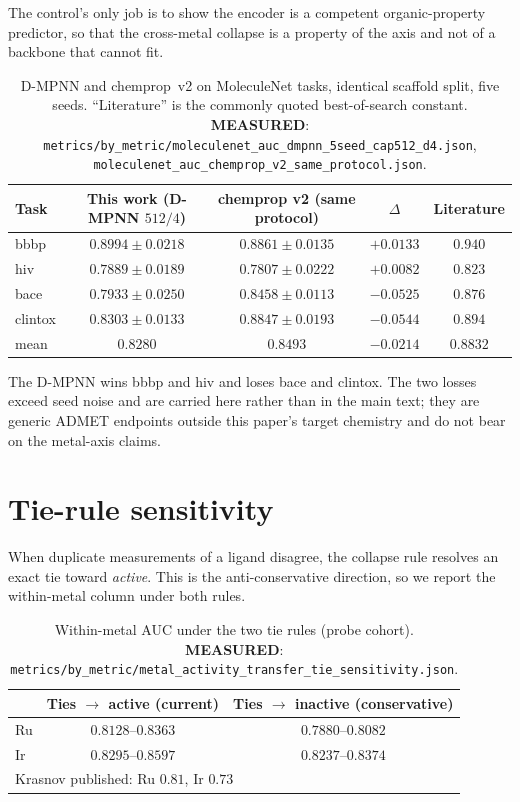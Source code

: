 \documentclass[11pt]{article}
\newcommand{\MEASURED}{\textbf{MEASURED}}
\begin{document}
The control's only job is to show the encoder is a competent organic-property
predictor, so that the cross-metal collapse is a property of the axis and not of
a backbone that cannot fit.

\begin{table}[h]
\centering
\caption{D-MPNN and chemprop~v2 on MoleculeNet tasks, identical scaffold split,
five seeds. ``Literature'' is the commonly quoted best-of-search constant.
\MEASURED: \texttt{metrics/by\_metric/moleculenet\_auc\_dmpnn\_5seed\_cap512\_d4.json},
\texttt{moleculenet\_auc\_chemprop\_v2\_same\_protocol.json}.}
\begin{tabular}{lcccc}
\toprule
Task & This work (D-MPNN $512/4$) & chemprop v2 (same protocol) & $\Delta$ & Literature \\
\midrule
bbbp    & $0.8994 \pm 0.0218$ & $0.8861 \pm 0.0135$ & $+0.0133$ & $0.940$ \\
hiv     & $0.7889 \pm 0.0189$ & $0.7807 \pm 0.0222$ & $+0.0082$ & $0.823$ \\
bace    & $0.7933 \pm 0.0250$ & $0.8458 \pm 0.0113$ & $-0.0525$ & $0.876$ \\
clintox & $0.8303 \pm 0.0133$ & $0.8847 \pm 0.0193$ & $-0.0544$ & $0.894$ \\
\midrule
mean    & $0.8280$ & $0.8493$ & $-0.0214$ & $0.8832$ \\
\bottomrule
\end{tabular}
\end{table}

The D-MPNN wins bbbp and hiv and loses bace and clintox. The two losses exceed
seed noise and are carried here rather than in the main text; they are generic
ADMET endpoints outside this paper's target chemistry and do not bear on the
metal-axis claims.

\section{Tie-rule sensitivity}
\label{sec:si:tie}

When duplicate measurements of a ligand disagree, the collapse rule resolves an
exact tie toward \emph{active}. This is the anti-conservative direction, so we
report the within-metal column under both rules.

\begin{table}[h]
\centering
\caption{Within-metal AUC under the two tie rules (probe cohort).
\MEASURED: \texttt{metrics/by\_metric/metal\_activity\_transfer\_tie\_sensitivity.json}.}
\begin{tabular}{lcc}
\toprule
 & Ties $\to$ active (current) & Ties $\to$ inactive (conservative) \\
\midrule
Ru & $0.8128$--$0.8363$ & $0.7880$--$0.8082$ \\
Ir & $0.8295$--$0.8597$ & $0.8237$--$0.8374$ \\
\midrule
\multicolumn{3}{l}{Krasnov published: Ru $0.81$, Ir $0.73$} \\
\bottomrule
\end{tabular}
\end{table}
\end{document}
